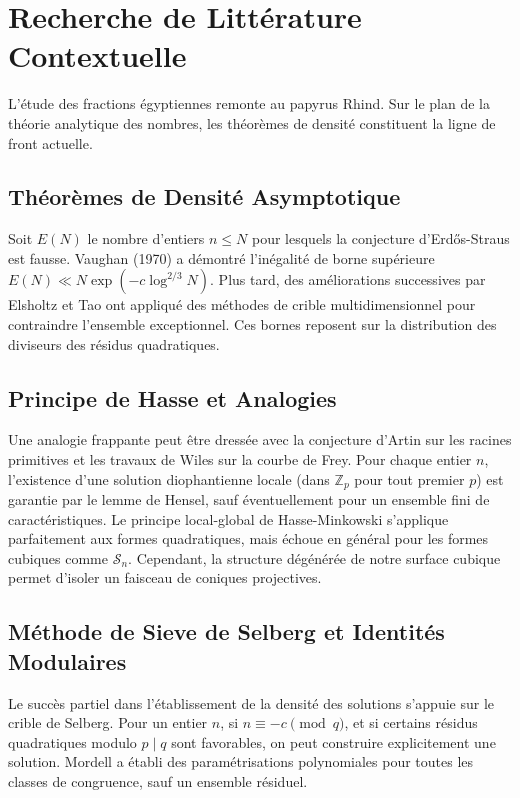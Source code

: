 \documentclass[11pt,a4paper]{article}
\begin{document}
\section{Recherche de Littérature Contextuelle}
\label{sec:literature}

L'étude des fractions égyptiennes remonte au papyrus Rhind. Sur le plan de la théorie analytique des nombres, les théorèmes de densité constituent la ligne de front actuelle.

\subsection{Théorèmes de Densité Asymptotique}
Soit $E(N)$ le nombre d'entiers $n \le N$ pour lesquels la conjecture d'Erdős-Straus est fausse. Vaughan (1970) a démontré l'inégalité de borne supérieure $E(N) \ll N \exp(-c \log^{2/3} N)$. Plus tard, des améliorations successives par Elsholtz et Tao ont appliqué des méthodes de crible multidimensionnel pour contraindre l'ensemble exceptionnel. Ces bornes reposent sur la distribution des diviseurs des résidus quadratiques.

\subsection{Principe de Hasse et Analogies}
Une analogie frappante peut être dressée avec la conjecture d'Artin sur les racines primitives et les travaux de Wiles sur la courbe de Frey. Pour chaque entier $n$, l'existence d'une solution diophantienne locale (dans $\mathbb{Z}_p$ pour tout premier $p$) est garantie par le lemme de Hensel, sauf éventuellement pour un ensemble fini de caractéristiques. Le principe local-global de Hasse-Minkowski s'applique parfaitement aux formes quadratiques, mais échoue en général pour les formes cubiques comme $\mathcal{S}_n$. Cependant, la structure dégénérée de notre surface cubique permet d'isoler un faisceau de coniques projectives.

\subsection{Méthode de Sieve de Selberg et Identités Modulaires}
Le succès partiel dans l'établissement de la densité des solutions s'appuie sur le crible de Selberg. Pour un entier $n$, si $n \equiv -c \pmod q$, et si certains résidus quadratiques modulo $p \mid q$ sont favorables, on peut construire explicitement une solution. Mordell a établi des paramétrisations polynomiales pour toutes les classes de congruence, sauf un ensemble résiduel.
\end{document}
